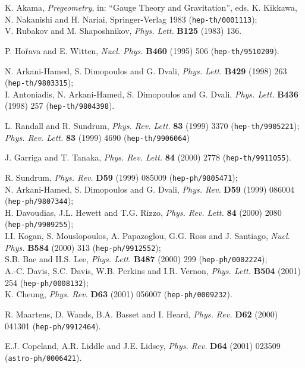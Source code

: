 \documentclass[prd,a4paper,twocolumn,superscriptaddress,nofootinbib,showpacs]{revtex4}
\def\npb#1#2#3{{\it Nucl. Phys.} {\bf B#1} (#2) #3 }
\def\plb#1#2#3{{\it Phys. Lett.} {\bf B#1} (#2) #3 }
\def\prd#1#2#3{{\it Phys. Rev. } {\bf D#1} (#2) #3 }
\def\prl#1#2#3{{\it Phys. Rev. Lett.} {\bf #1} (#2) #3 }
\def\bb#1{{\tt hep-th/#1}}
\def\heph#1{{\tt hep-ph/#1}}
\def\aph#1{{\tt astro-ph/#1}}
\begin{document}
\begin{thebibliography}{99}

K. Akama, {\it Pregeometry}, in: ``Gauge Theory and Gravitation'', eds. 
K. Kikkawa, N. Nakanishi and H. Nariai, Springer-Verlag 1983 (\bb{0001113});\\
V. Rubakov and M. Shaposhnikov, \plb{125}{1983}{136.}

P. Ho\v{r}ava and E. Witten, \npb{460}{1995}{506} (\bb{9510209}).

N. Arkani-Hamed, S. Dimopoulos and G. Dvali, \plb{429}{1998}{263} (\bb{9803315});\\
I. Antoniadis, N. Arkani-Hamed, S. Dimopoulos and G. Dvali, \plb{436}{1998}{257} (\bb{9804398}).


L. Randall and R. Sundrum, \prl{83}{1999}{3370} (\bb{9905221});
\prl{83}{1999}{4690} (\bb{9906064})

J. Garriga and T. Tanaka, \prl{84}{2000}{2778} (\bb{9911055}).

R. Sundrum, \prd{59}{1999}{085009} (\heph{9805471});\\
N. Arkani-Hamed, S. Dimopoulos and G. Dvali, \prd{59}{1999}{086004} (\heph{9807344});\\
H. Davoudias, J.L. Hewett and T.G. Rizzo, \prl{84}{2000}{2080} (\heph{9909255});\\
I.I. Kogan, S. Mouslopoulos, A. Papazoglou, G.G. Ross and J. Santiago, \npb{584}{2000}{313} (\heph{9912552});\\
S.B. Bae and H.S. Lee, \plb{487}{2000}{299} (\heph{0002224});\\
A.-C. Davis, S.C. Davis, W.B. Perkins and I.R. Vernon, \plb{504}{2001}{254} (\heph{0008132});\\
K. Cheung, \prd{63}{2001}{056007} (\heph{0009232}).


R. Maartens, D. Wands, B.A. Basset and I. Heard, \prd{62}{2000}{041301}
(\heph{9912464}).


E.J. Copeland, A.R. Liddle and J.E. Lidsey, \prd{64}{2001}{023509} (\aph{0006421}).


\end{thebibliography}
\end{document}
